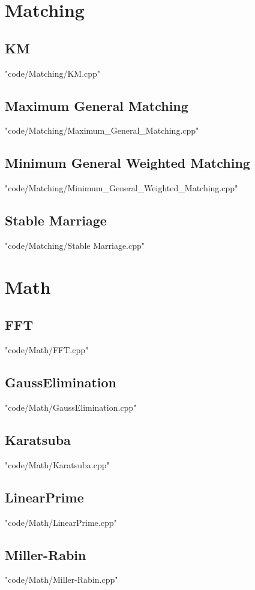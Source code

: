 \section{Matching}
\subsection{KM}
 {"code/Matching/KM.cpp"}
\subsection{Maximum General Matching}
 {"code/Matching/Maximum_General_Matching.cpp"}
\subsection{Minimum General Weighted Matching}
 {"code/Matching/Minimum_General_Weighted_Matching.cpp"}
\subsection{Stable Marriage}
 {"code/Matching/Stable Marriage.cpp"}
\section{Math}
\subsection{FFT}
 {"code/Math/FFT.cpp"}
\subsection{GaussElimination}
 {"code/Math/GaussElimination.cpp"}
\subsection{Karatsuba}
 {"code/Math/Karatsuba.cpp"}
\subsection{LinearPrime}
 {"code/Math/LinearPrime.cpp"}
\subsection{Miller-Rabin}
 {"code/Math/Miller-Rabin.cpp"}
